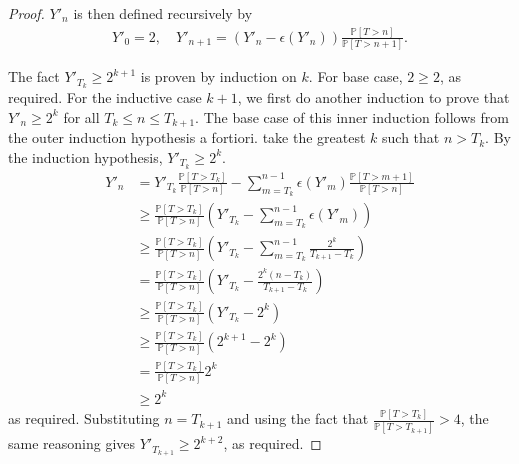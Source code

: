 \begin{proof}
$Y'_n$ is then defined recursively by
\begin{align*}
    Y'_0 = 2, \quad
    Y'_{n+1} = (Y'_n - \epsilon(Y'_n)) \frac{\mathbb P[T > n]}{\mathbb P[T > n+1]}.
\end{align*}

The fact $Y'_{T_k} \geq 2^{k+1}$ is proven by induction on $k$. For base case, $2 \geq 2$, as required. For the inductive case $k+1$, we first do another induction to prove that $Y'_n \geq 2^k$ for all $T_k \leq n \leq T_{k+1}$. The base case of this inner induction follows from the outer induction hypothesis a fortiori. take the greatest $k$ such that $n > T_k$. By the induction hypothesis, $Y'_{T_k} \geq 2^k$.
\begin{align*}
    Y'_n & = Y'_{T_k} \frac{\mathbb P[T > T_k]}{\mathbb P[T > n]} - \sum_{m=T_k}^{n-1} \epsilon(Y'_m) \frac{\mathbb P[T > m+1]}{\mathbb P[T > n]} \\
    & \geq \frac{\mathbb P[T > T_k]}{\mathbb P[T > n]} (Y'_{T_k} - \sum_{m=T_k}^{n-1} \epsilon(Y'_m)) \\
    & \geq \frac{\mathbb P[T > T_k]}{\mathbb P[T > n]} (Y'_{T_k} - \sum_{m=T_k}^{n-1} \frac{2^k}{T_{k+1}-T_k}) \\
    & = \frac{\mathbb P[T > T_k]}{\mathbb P[T > n]} (Y'_{T_k} - \frac{2^k (n - T_k)}{T_{k+1}-T_k}) \\
    & \geq \frac{\mathbb P[T > T_k]}{\mathbb P[T > n]} (Y'_{T_k} - 2^k) \\
    & \geq \frac{\mathbb P[T > T_k]}{\mathbb P[T > n]} (2^{k+1} - 2^k) \\
    & = \frac{\mathbb P[T > T_k]}{\mathbb P[T > n]} 2^k \\
    & \geq 2^k
\end{align*}
as required. Substituting $n = T_{k+1}$ and using the fact that $\frac{\mathbb P[T > T_k]}{\mathbb P[T > T_{k+1}]} > 4$, the same reasoning gives $Y'_{T_{k+1}} \geq 2^{k+2}$, as required.


\end{proof}
